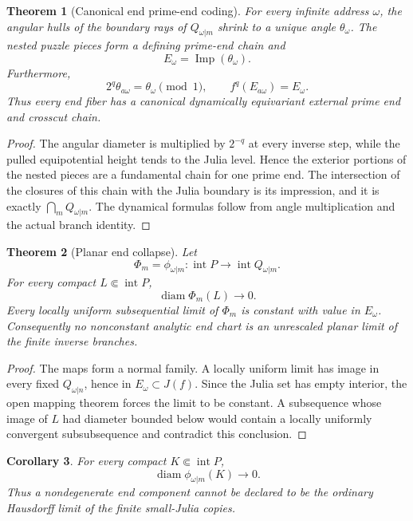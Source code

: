 \documentclass[11pt]{article}
\newtheorem{theorem}{Theorem}[section]
\newtheorem{corollary}[theorem]{Corollary}
\theoremstyle{definition}
\theoremstyle{remark}
\newcommand{\Imp}{\operatorname{Imp}}
\begin{document}
\begin{theorem}[Canonical end prime-end coding]\label{thm:primeend}
For every infinite address $\omega$, the angular hulls of the boundary rays of $Q_{\omega|m}$ shrink to a unique angle $\theta_\omega$.  The nested puzzle pieces form a defining prime-end chain and
\[
 E_\omega=\Imp(\theta_\omega).
\]
Furthermore,
\[
 2^q\theta_{a\omega}=\theta_\omega\pmod1,
 \qquad
 f^q(E_{a\omega})=E_\omega.
\]
Thus every end fiber has a canonical dynamically equivariant external prime end and crosscut chain.
\end{theorem}

\begin{proof}
The angular diameter is multiplied by $2^{-q}$ at every inverse step, while the pulled equipotential height tends to the Julia level.  Hence the exterior portions of the nested pieces are a fundamental chain for one prime end.  The intersection of the closures of this chain with the Julia boundary is its impression, and it is exactly $\bigcap_mQ_{\omega|m}$.  The dynamical formulas follow from angle multiplication and the actual branch identity.
\end{proof}

\begin{theorem}[Planar end collapse]\label{thm:collapse}
Let
\[
 \Phi_m=\phi_{\omega|m}:\operatorname{int}P\to\operatorname{int}Q_{\omega|m}.
\]
For every compact $L\Subset\operatorname{int}P$,
\[
 \operatorname{diam}\Phi_m(L)\longrightarrow0.
\]
Every locally uniform subsequential limit of $\Phi_m$ is constant with value in $E_\omega$.  Consequently no nonconstant analytic end chart is an unrescaled planar limit of the finite inverse branches.
\end{theorem}

\begin{proof}
The maps form a normal family.  A locally uniform limit has image in every fixed $Q_{\omega|n}$, hence in $E_\omega\subset J(f)$.  Since the Julia set has empty interior, the open mapping theorem forces the limit to be constant.  A subsequence whose image of $L$ had diameter bounded below would contain a locally uniformly convergent subsubsequence and contradict this conclusion.
\end{proof}

\begin{corollary}
For every compact $K\Subset\operatorname{int}P$,
\[
 \operatorname{diam}\phi_{\omega|m}(K)\to0.
\]
Thus a nondegenerate end component cannot be declared to be the ordinary Hausdorff limit of the finite small-Julia copies.
\end{corollary}
\end{document}

